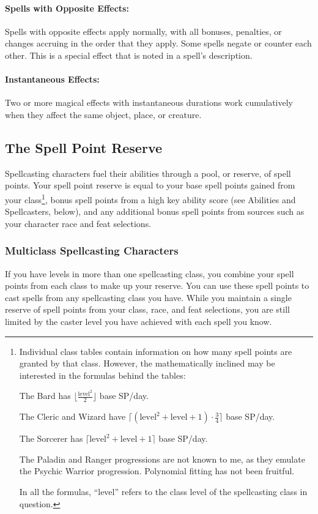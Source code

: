 \paragraph{Spells with Opposite Effects:} Spells with opposite effects apply normally, with all bonuses, penalties, or changes accruing in the order that they apply. 
Some spells negate or counter each other. This is a special effect that is noted in a spell's description.

\paragraph{Instantaneous Effects:} Two or more magical effects with instantaneous durations work cumulatively when they affect the same object, place, or creature.
\subsection{The Spell Point Reserve}
Spellcasting characters fuel their abilities through a pool, or reserve, of spell points. 
Your spell point reserve is equal to your base spell points gained from your class\footnote{
Individual class tables contain information on how many spell points are granted by that class. However, the mathematically inclined may be interested in the formulas behind the tables:
\begin{list}{}{\leftmargin=1em}
 \item The Bard has $\lfloor\frac{\text{level}^2}{2}\rfloor$ base SP/day.
 \item The Cleric and Wizard have $\lceil (\text{level}^2+\text{level}+1) \cdot \frac{3}{4}\rceil$ base SP/day.
 \item The Sorcerer has $\lceil \text{level}^2+\text{level}+1 \rceil$ base SP/day.
 \item The Paladin and Ranger progressions are not known to me, as they emulate the Psychic Warrior progression. Polynomial fitting has not been fruitful.
\end{list}
In all the formulas, ``level'' refers to the class level of the spellcasting class in question.}, bonus spell points from a high key ability score (see Abilities and Spellcasters, below), 
and any additional bonus spell points from sources such as your character race and feat selections.
\subsubsection{Multiclass Spellcasting Characters}
If you have levels in more than one spellcasting class, you combine your spell points from each class to make up your reserve. 
You can use these spell points to cast spells from any spellcasting class you have. 
While you maintain a single reserve of spell points from your class, race, and feat selections, 
you are still limited by the caster level you have achieved with each spell you know. 
